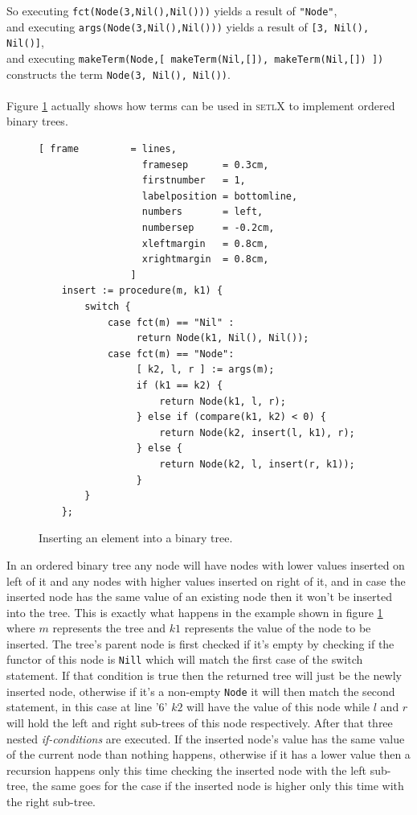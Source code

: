 \documentclass[11pt]{report}
\begin{document}
So executing \texttt{fct(Node(3,Nil(),Nil()))} yields a result of \texttt{"Node"},\\
and executing \texttt{args(Node(3,Nil(),Nil()))} yields a result of \texttt{[3, Nil(), Nil()]},\\
and executing \texttt{makeTerm(Node,[ makeTerm(Nil,[]), makeTerm(Nil,[]) ])} constructs the term \texttt{Node(3, Nil(), Nil())}.
\\
\\
Figure \ref{fig:binary-tree-no-matching.stlx} actually shows how terms can be used in \textsc{setlX} to implement ordered binary trees.
\pagebreak
\begin{figure}[!ht]
\centering
\begin{Verbatim}[ frame         = lines, 
                  framesep      = 0.3cm, 
                  firstnumber   = 1,
                  labelposition = bottomline,
                  numbers       = left,
                  numbersep     = -0.2cm,
                  xleftmargin   = 0.8cm,
                  xrightmargin  = 0.8cm,
                ]
    insert := procedure(m, k1) {
        switch {
            case fct(m) == "Nil" : 
                 return Node(k1, Nil(), Nil());
            case fct(m) == "Node": 
                 [ k2, l, r ] := args(m);
                 if (k1 == k2) {
                     return Node(k1, l, r);
                 } else if (compare(k1, k2) < 0) { 
                     return Node(k2, insert(l, k1), r);
                 } else {
                     return Node(k2, l, insert(r, k1));
                 }
        }
    };
\end{Verbatim}
\vspace*{-0.3cm}
\caption{Inserting an element into a binary tree.}
\label{fig:binary-tree-no-matching.stlx}
\end{figure}

In an ordered binary tree any node will have nodes with lower values inserted on left of it and any nodes with higher values inserted on right of it, and in case the inserted node has the same value of an existing node then it won't be inserted into the tree. This is exactly what happens in the example shown in figure \ref{fig:binary-tree-no-matching.stlx} where $m$ represents the tree and $k1$ represents the value of the node to be inserted. The tree's parent node is first checked if it's empty by checking if the functor of this node is \texttt{Nill} which will match the first case of the switch statement. If that condition is true then the returned tree will just be the newly inserted node, otherwise if it's a non-empty \texttt{Node} it will then match the second statement, in this case at line '$6$' $k2$ will have the value of this node while $l$ and $r$ will hold the left and right sub-trees of this node respectively. After that three nested \textsl{if-conditions} are executed. If the inserted node's value has the same value of the current node than nothing happens, otherwise if it has a lower value then a recursion happens only this time checking the inserted node with the left sub-tree, the same goes for the case if the inserted node is higher only this time with the right sub-tree. 
\end{document}

